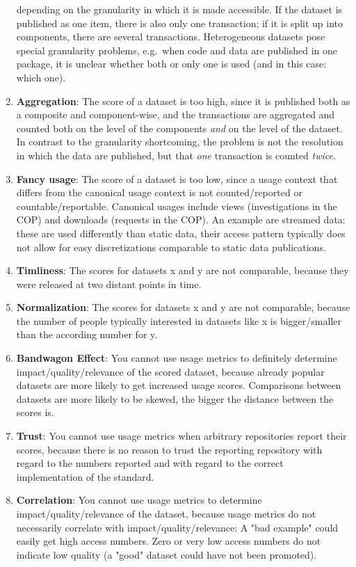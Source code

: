 \documentclass[conference, a4paper]{IEEEtran}\usepackage[]{graphicx}\usepackage[]{color}
\begin{document}
\begin{enumerate}
depending on the granularity in which it is made accessible.
If the dataset is published as one item, there is also only one transaction;
if it is split up into components, there are several transactions.
Heterogeneous datasets pose special granularity problems,
e.g.\ when code and data are published in one package,
it is unclear whether both or only one is used (and in this case: which one).
\item \textbf{Aggregation}: The score of a dataset is too high,
since it is published both as a composite and component-wise,
and the transactions are aggregated and counted both on the level of the components
\emph{and} on the level of the dataset.
In contrast to the granularity shortcoming, the problem is not the resolution
in which the data are published, but that \emph{one} transaction is counted \emph{twice}.
\item \textbf{Fancy usage}: The score of a dataset is too low,
since a usage context that differs from the canonical usage context
is not counted/reported or countable/reportable.
Canonical usages include views (investigations in the COP) and
downloads (requests in the COP).
An example are streamed data: these are used differently than static data,
their access pattern typically does not allow
for easy discretizations comparable to static data publications.

\item \textbf{Timliness}: The scores for datasets x and y are not comparable,
because they were released at two distant points in time.
\item \textbf{Normalization}: The scores for datasets x and y are not comparable,
because the number of people typically interested in datasets like x is bigger/smaller than the according number for y.

\item \textbf{Bandwagon Effect}: You cannot use usage metrics to definitely determine impact/quality/relevance of the scored dataset,
because already popular datasets are more likely to get increased usage scores.
Comparisons between datasets are more likely to be skewed, the bigger the distance between the scores is.
\item \textbf{Trust}: You cannot use usage metrics when arbitrary repositories report their scores,
because there is no reason to trust the reporting repository with regard to
the numbers reported and with regard to the correct implementation of the standard.
\item \textbf{Correlation}: You cannot use usage metrics to determine impact/quality/relevance of the dataset,
because usage metrics do not necessarily correlate with impact/quality/relevance:
A "bad example" could easily get high access numbers.
Zero or very low access numbers do not indicate low quality (a "good" dataset could have not been promoted).
\end{enumerate}
\end{document}
